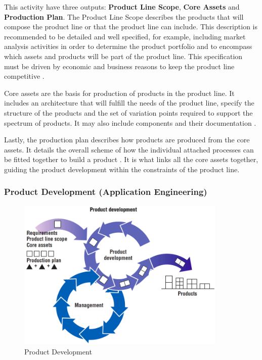 This activity have three outputs: \textbf{Product Line Scope}, \textbf{Core
Assets} and \textbf{Production Plan}. The Product Line Scope describes the
products that will compose the product line or that the product line can include. This description is recommended to be detailed and well 
specified, for example, including market analysis activities in order to determine the product 
portfolio and to encompass which assets and products will be part of the product line. This 
specification must be driven by economic and business reasons to keep the product line 
competitive \citep{rafael2013systems}. 

Core assets are the basis for production of products in the product line. It
includes an architecture that will fulfill the needs of the product line, specify 
the structure of the products and the set of variation points required to support the 
spectrum of products. It may also include components and their documentation \citep{clements2002software}. 

Lastly, the production plan describes how products are produced from the core
assets. It details the overall scheme of how the individual attached processes can be 
fitted together to build a product \citep{clements2002software}. It is what links all the 
core assets together, guiding the product development within the constraints of the product line.

\subsubsection{Product Development (Application Engineering)}

\begin{figure}[htp]
\begin{center}
  \includegraphics[width=10cm]{chapters/background/img/SPLproduct-development.png}
  \caption[Product Development]{Product Development \citep{clements2002software}}
  \label{fg:spl-productdev}
\end{center}
\end{figure}

